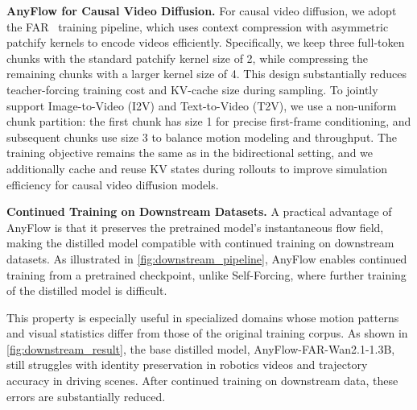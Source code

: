 \documentclass{llmxive}
\providecommand{\myPara}[1]{\noindent\textbf{#1}}
\begin{document}
\myPara{AnyFlow for Causal Video Diffusion.}
For causal video diffusion, we adopt the FAR~\cite{gu2025long} training pipeline, which uses context compression with asymmetric patchify kernels to encode videos efficiently. Specifically, we keep three full-token chunks with the standard patchify kernel size of 2, while compressing the remaining chunks with a larger kernel size of 4. This design substantially reduces teacher-forcing training cost and KV-cache size during sampling.
%
To jointly support Image-to-Video (I2V) and Text-to-Video (T2V), we use a non-uniform chunk partition: the first chunk has size 1 for precise first-frame conditioning, and subsequent chunks use size 3 to balance motion modeling and throughput.
%
The training objective remains the same as in the bidirectional setting, and we additionally cache and reuse KV states during rollouts to improve simulation efficiency for causal video diffusion models.

\myPara{Continued Training on Downstream Datasets.}
A practical advantage of AnyFlow is that it preserves the pretrained model's instantaneous flow field, making the distilled model compatible with continued training on downstream datasets. As illustrated in \cref{fig:downstream_pipeline}, AnyFlow enables continued training from a pretrained checkpoint, unlike Self-Forcing, where further training of the distilled model is difficult.

This property is especially useful in specialized domains whose motion patterns and visual statistics differ from those of the original training corpus. As shown in \cref{fig:downstream_result}, the base distilled model, AnyFlow-FAR-Wan2.1-1.3B, still struggles with identity preservation in robotics videos and trajectory accuracy in driving scenes. After continued training on downstream data, these errors are substantially reduced.
\end{document}
